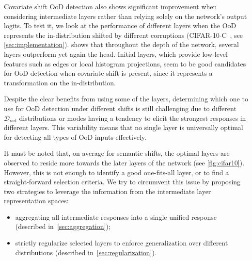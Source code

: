 \documentclass[10pt,twocolumn,a4paper]{article}
\begin{document}

Covariate shift OoD detection also shows significant improvement when considering intermediate layers rather than relying solely on the network’s output logits. To test it, we look at the performance of different layers when the OoD represents the in-distribution shifted by different corruptions (\textsc{CIFAR-10-C}~\cite{hendrycks2018benchmarking}, see \cref{sec:implementation}).  shows that throughout the depth of the network, several layers outperform yet again the head. Initial layers, which provide low-level features such as edges or local histogram projections, seem to be good candidates for OoD detection when covariate shift is present, since it represents a transformation on the in-distribution.

Despite the clear benefits from using some of the layers, determining which one to use for OoD detection under different shifts is still challenging due to different \(\mathcal{D}_{out}\) distributions or modes having a tendency to elicit the strongest responses in different layers. This variability means that no single layer is universally optimal for detecting all types of OoD inputs effectively.

It must be noted that, on average for semantic shifts, the optimal layers are observed to reside more towards the later layers of the network (see \cref{fig:cifar10}). However, this is not enough to identify a good one-fits-all layer, or to find a straight-forward selection criteria.
We try to circumvent this issue by proposing two strategies to leverage the information from the intermediate layer representation spaces:
\begin{itemize}
    \item aggregating all intermediate responses into a single unified response (described in~\cref{sec:aggregation});
    \item strictly regularize selected layers to enforce generalization over different distributions (described in~\cref{sec:regularization}).
\end{itemize}

\end{document}

